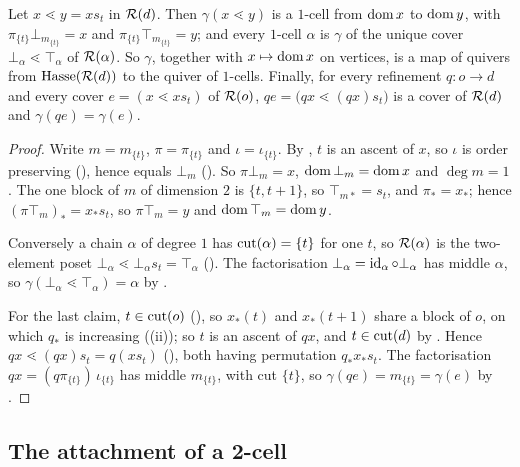 \documentclass[11pt]{article}
\begin{document}
\begin{corollary}\label{cor:covercell}
  Let $x \lessdot y = xs_t$ in $\mathcal{R}(d)$. Then $\gamma(x \lessdot y)$ is a $1$-cell from
  $\operatorname{dom} x$ to $\operatorname{dom} y$, with $\pi_{\{t\}}\bot_{m_{\{t\}}} = x$ and $\pi_{\{t\}}\top_{m_{\{t\}}} = y$;
  and every $1$-cell $\alpha$ is $\gamma$ of the unique cover $\bot_\alpha \lessdot \top_\alpha$ of
  $\mathcal{R}(\alpha)$. So $\gamma$, together with $x \mapsto \operatorname{dom} x$ on vertices, is a map of quivers
  from $\mathrm{Hasse}(\mathcal{R}(d))$ to the quiver of $1$-cells. Finally, for every refinement
  $q : o \to d$ and every cover $e = (x \lessdot xs_t)$ of $\mathcal{R}(o)$,
  $qe = \bigl(qx \lessdot (qx)s_t\bigr)$ is a cover of $\mathcal{R}(d)$ and $\gamma(qe) = \gamma(e)$.
\end{corollary}
\begin{proof}
  Write $m = m_{\{t\}}$, $\pi = \pi_{\{t\}}$ and $\iota = \iota_{\{t\}}$. By , $t$ is
  an ascent of $x$, so $\iota$ is order preserving (), hence equals
  $\bot_m$ (). So $\pi\bot_m = x$, $\operatorname{dom}\bot_m = \operatorname{dom} x$ and $\deg m = 1$. The one
  block of $m$ of dimension $2$ is $\{t, t+1\}$, so $\top_{m*} = s_t$, and $\pi_* = x_*$; hence
  $(\pi\top_m)_* = x_*s_t$, so $\pi\top_m = y$ and $\operatorname{dom}\top_m = \operatorname{dom} y$.

  Conversely a chain $\alpha$ of degree $1$ has $\operatorname{cut}(\alpha) = \{t\}$ for one $t$, so
  $\mathcal{R}(\alpha)$ is the two-element poset $\bot_\alpha \lessdot \bot_\alpha s_t = \top_\alpha$
  (). The factorisation $\bot_\alpha = \operatorname{id}_\alpha \circ \bot_\alpha$
  has middle $\alpha$, so $\gamma(\bot_\alpha \lessdot \top_\alpha) = \alpha$ by
  .

  For the last claim, $t \in \operatorname{cut}(o)$ (), so $x_*(t)$ and $x_*(t+1)$ share a block
  of $o$, on which $q_*$ is increasing ((ii)); so $t$ is an ascent of $qx$, and
  $t \in \operatorname{cut}(d)$ by . Hence $qx \lessdot (qx)s_t = q(xs_t)$ (),
  both having permutation $q_*x_*s_t$. The factorisation $qx = (q\pi_{\{t\}})\,\iota_{\{t\}}$ has
  middle $m_{\{t\}}$, with cut $\{t\}$, so $\gamma(qe) = m_{\{t\}} = \gamma(e)$ by
  .
\end{proof}

\subsection{The attachment of a 2-cell}
\end{document}
